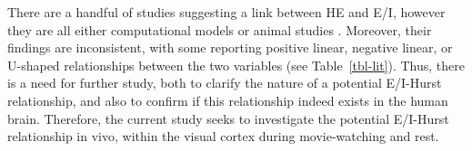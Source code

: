 \documentclass[
true
]{sn-jnl}
\begin{document}
There are a handful of studies suggesting a link between HE and E/I,
however they are all either computational models or animal studies
\citep{liangExcitationInhibitionBalance2024, poilCriticalStateDynamicsAvalanches2012, lombardiBalanceExcitationInhibition2017, baumgartenCriticalExcitationinhibitionBalance2019, bruiningMeasurementExcitationinhibitionRatio2020, trakoshisIntrinsicExcitationinhibitionImbalance, gaoInferringSynapticExcitation2017}.
Moreover, their findings are inconsistent, with some reporting positive
linear, negative linear, or U-shaped relationships between the two
variables (see Table~\ref{tbl-lit}). Thus, there is a need for further
study, both to clarify the nature of a potential E/I-Hurst relationship,
and also to confirm if this relationship indeed exists in the human
brain. Therefore, the current study seeks to investigate the potential
E/I-Hurst relationship in vivo, within the visual cortex during
movie-watching and rest.
\end{document}
